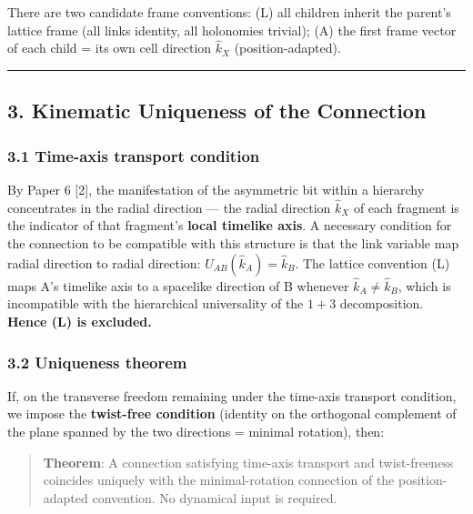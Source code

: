 \documentclass[
]{ltjsarticle}
\begin{document}
There are two candidate frame conventions: (L) all children inherit the
parent's lattice frame (all links identity, all holonomies trivial); (A)
the first frame vector of each child = its own cell direction
\(\hat k_X\) (position-adapted).

\begin{center}\rule{0.5\linewidth}{0.5pt}\end{center}

\subsection{3. Kinematic Uniqueness of the
Connection}\label{kinematic-uniqueness-of-the-connection}

\subsubsection{3.1 Time-axis transport
condition}\label{time-axis-transport-condition}

By Paper 6 {[}2{]}, the manifestation of the asymmetric bit within a
hierarchy concentrates in the radial direction --- the radial direction
\(\hat k_X\) of each fragment is the indicator of that fragment's
\textbf{local timelike axis}. A necessary condition for the connection
to be compatible with this structure is that the link variable map
radial direction to radial direction: \(U_{AB}(\hat k_A)=\hat k_B\). The
lattice convention (L) maps A's timelike axis to a spacelike direction
of B whenever \(\hat k_A\ne\hat k_B\), which is incompatible with the
hierarchical universality of the \(1{+}3\) decomposition. \textbf{Hence
(L) is excluded.}

\subsubsection{3.2 Uniqueness theorem}\label{uniqueness-theorem}

If, on the transverse freedom remaining under the time-axis transport
condition, we impose the \textbf{twist-free condition} (identity on the
orthogonal complement of the plane spanned by the two directions =
minimal rotation), then:

\begin{quote}
\textbf{Theorem}: A connection satisfying time-axis transport and
twist-freeness coincides uniquely with the minimal-rotation connection
of the position-adapted convention. No dynamical input is required.
\end{quote}
\end{document}
